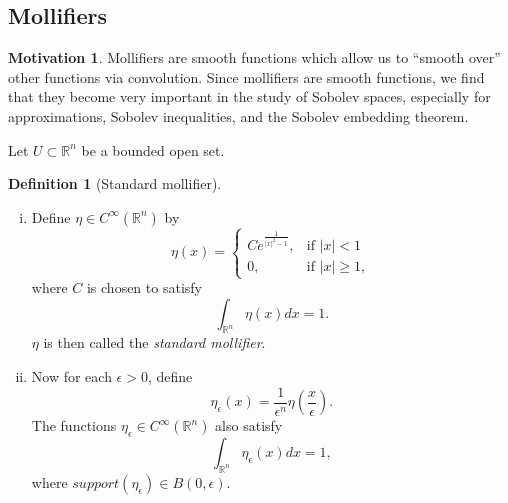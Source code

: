 \documentclass[11pt]{article}
\theoremstyle{definition}
\newtheorem*{definition}{Definition}
\newtheorem*{motivation}{Motivation}
\begin{document}
\newpage

\subsection{Mollifiers}
\begin{motivation}
	Mollifiers are smooth functions which allow us to ``smooth over'' other functions via convolution.
	Since mollifiers are smooth functions, we find that they become very important in the study of Sobolev spaces,
	especially for approximations, Sobolev inequalities, and the Sobolev embedding theorem.
\end{motivation}
Let $U \subset \mathbb{R}^n$ be a bounded open set.
\begin{definition}[Standard mollifier]~ 
	\begin{enumerate}[(i)]
		\item Define $\eta \in C^{\infty}(\mathbb{R}^n)$ by
			\begin{equation*}
				\eta(x) =
				\begin{cases}
					C e^{\frac{1}{|x|^2 - 1}},& \text{if } |x| < 1 \\
					0,& \text{if } |x| \geq 1,
				\end{cases}
			\end{equation*}
			where $C$ is chosen to satisfy
			\begin{equation*}
				\int_{\mathbb{R}^n}{\eta(x)dx} = 1.
			\end{equation*}
			$\eta$ is then called the \textit{standard mollifier}.
		\item Now for each $\epsilon > 0$, define
			\begin{equation*}
				\eta_{\epsilon}(x) = \frac{1}{\epsilon^n}\eta\left(\frac{x}{\epsilon}\right).
			\end{equation*}
			The functions $\eta_{\epsilon} \in C^{\infty}(\mathbb{R}^n)$ also satisfy
			\begin{equation*}
				\int_{\mathbb{R}^n}{\eta_{\epsilon}(x)dx} = 1,
			\end{equation*}
			where $support(\eta_{\epsilon}) \in B(0,\epsilon)$.
	\end{enumerate}
\end{definition}
\end{document}
